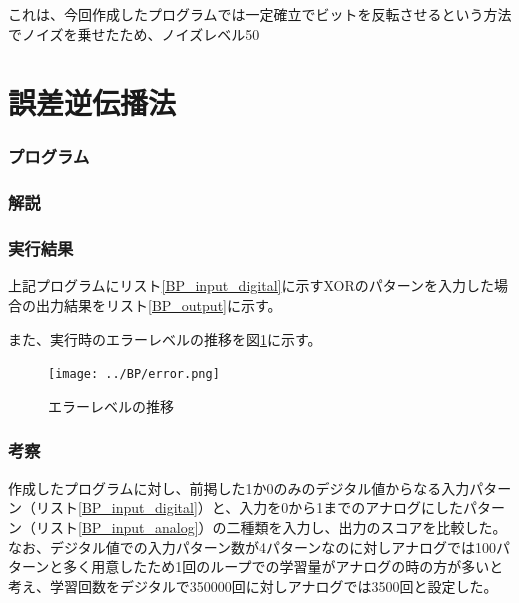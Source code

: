 \documentclass{jsarticle}
\begin{document}
これは、今回作成したプログラムでは一定確立でビットを反転させるという方法でノイズを乗せたため、ノイズレベル50%

\part{誤差逆伝播法}
\section{プログラム}


\section{解説}


\section{実行結果}
上記プログラムにリスト\ref{BP_input_digital}に示すXORのパターンを入力した場合の出力結果をリスト\ref{BP_output}に示す。



また、実行時のエラーレベルの推移を図\ref{BP_error_level}に示す。
\begin{figure}[H]
	\begin{center}
		\texttt{[image: ../BP/error.png]}
		\caption{エラーレベルの推移\label{BP_error_level}}
	\end{center}
\end{figure}

\section{考察}
作成したプログラムに対し、前掲した1か0のみのデジタル値からなる入力パターン（リスト\ref{BP_input_digital}）と、入力を0から1までのアナログにしたパターン（リスト\ref{BP_input_analog}）の二種類を入力し、出力のスコアを比較した。
なお、デジタル値での入力パターン数が4パターンなのに対しアナログでは100パターンと多く用意したため1回のループでの学習量がアナログの時の方が多いと考え、学習回数をデジタルで350000回に対しアナログでは3500回と設定した。

\end{document}
